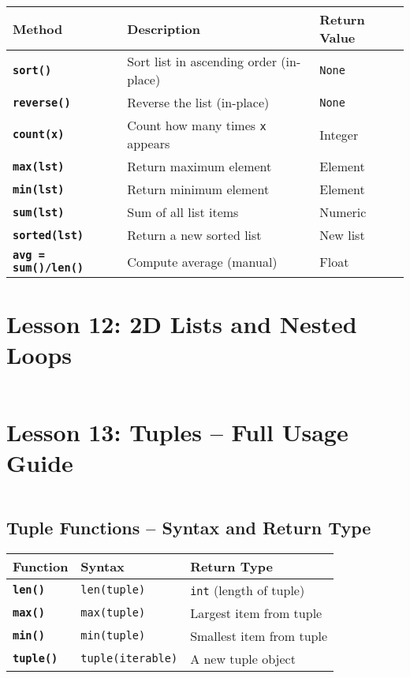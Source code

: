 \documentclass[a4paper,11pt]{article}
\begin{document}
	\begin{tabular}{>{\bfseries}p{3.5cm} p{6cm} p{3.5cm}}
		\toprule
		Method & Description & Return Value \\
		\midrule
		
		\texttt{sort()}        & Sort list in ascending order (in-place) & \texttt{None} \\
		\texttt{reverse()}     & Reverse the list (in-place) & \texttt{None} \\
		\texttt{count(x)}      & Count how many times \texttt{x} appears & Integer \\
		\texttt{max(lst)}      & Return maximum element & Element \\
		\texttt{min(lst)}      & Return minimum element & Element \\
		\texttt{sum(lst)}      & Sum of all list items & Numeric \\
		\texttt{sorted(lst)}   & Return a new sorted list & New list \\
		\texttt{avg = sum()/len()} & Compute average (manual) & Float \\
		
		\bottomrule
	\end{tabular}
	
	
	\section{Lesson 12: 2D Lists and Nested Loops}
	\inputminted{python}{Python_Files/nested_list_guid.py}
	
	\section{Lesson 13: Tuples – Full Usage Guide}
	\inputminted{python}{Python_Files/tuples_guid.py}
	
	\vspace{1em}
	\subsection*{Tuple Functions – Syntax and Return Type}
	
	\begin{tabular}{>{\bfseries}p{3.5cm} p{7cm} p{3cm}}
		\toprule
		Function & Syntax & Return Type \\
		\midrule
		
		\texttt{len()} & \texttt{len(tuple)} & \texttt{int} (length of tuple) \\
		
		\texttt{max()} & \texttt{max(tuple)} & Largest item from tuple \\
		
		\texttt{min()} & \texttt{min(tuple)} & Smallest item from tuple \\
		
		\texttt{tuple()} & \texttt{tuple(iterable)} & A new tuple object \\
		
		\bottomrule
	\end{tabular}
	
	
	
	
	
	
\end{document}
